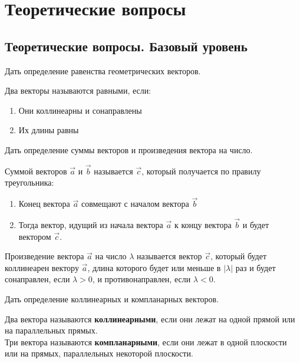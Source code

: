 
\section{Теоретические вопросы}

\subsection{Теоретические вопросы. Базовый уровень}

\begin{question}
  Дать определение равенства геометрических векторов.
\end{question}
\begin{answer}
  Два векторы называются равными, если:
  \begin{enumerate}
    \item Они коллинеарны и сонаправлены
    \item Их длины равны
  \end{enumerate}
\end{answer}

\begin{question}
  Дать определение суммы векторов и произведения вектора на число.
\end{question}
\begin{answer}
  Суммой векторов $\vec{a}$ и $\vec{b}$ называется $\vec{c}$, который получается по правилу треугольника:
  \begin{enumerate}
    \item Конец вектора $\vec{a}$ совмещают с началом вектора $\vec{b}$
    \item Тогда вектор, идущий из начала вектора $\vec{a}$ к концу вектора $\vec{b}$ и будет вектором $\vec{c}$.
  \end{enumerate} 

  Произведение вектора $\vec{a}$ на число $\lambda$ называется вектор $\vec{c}$, который будет коллинеарен вектору $\vec{a}$, длина которого будет или меньше в $|\lambda|$ раз и будет сонаправлен, если $\lambda > 0$, и противонаправлен, если $\lambda < 0$.
\end{answer}

\begin{question}
  Дать определение коллинеарных и компланарных векторов.
\end{question}
\begin{answer}
  Два вектора называются \textbf{коллинеарными}, если они лежат на одной прямой или на параллельных прямых. \\
  Три вектора называются \textbf{компланарными}, если они лежат в одной плоскости или на прямых, параллельных некоторой плоскости.  
\end{answer}

